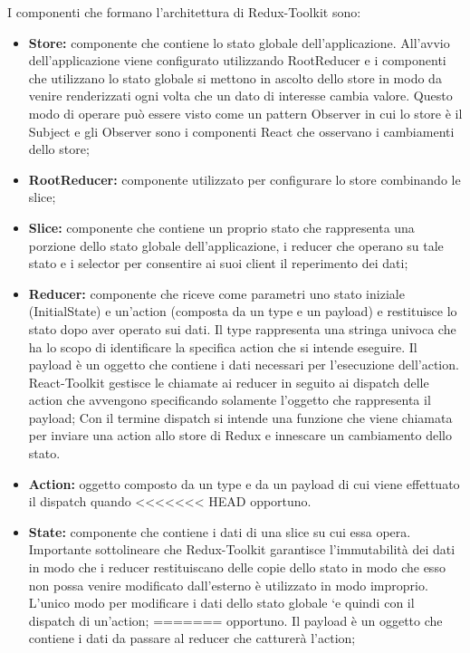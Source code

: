 I componenti che formano l'architettura di Redux-Toolkit sono:
\begin{itemize}
    \item \textbf{Store:} componente che contiene lo stato globale dell'applicazione.
          All'avvio dell'applicazione viene configurato utilizzando RootReducer e i componenti che utilizzano
          lo stato globale si mettono in ascolto dello store in modo da venire renderizzati ogni volta che un dato
          di interesse cambia valore. Questo modo di operare può essere visto come un pattern Observer in
          cui lo store è il Subject e gli Observer sono i componenti React che osservano i cambiamenti dello store;
    \item \textbf{RootReducer:} componente utilizzato per configurare lo store combinando le slice;
    \item \textbf{Slice:} componente che contiene un proprio stato che rappresenta una porzione dello stato globale
          dell'applicazione, i reducer che operano su tale stato e i selector per consentire ai suoi client il
          reperimento dei dati;
    \item \textbf{Reducer:} componente che riceve come parametri uno stato iniziale (InitialState) e un'action
          (composta da un type e un payload) e restituisce lo stato dopo aver operato sui dati.
          Il type rappresenta una stringa univoca che ha lo scopo di identificare la specifica action che si intende eseguire.
          Il payload è un oggetto che contiene i dati necessari per l'esecuzione dell'action.
          React-Toolkit gestisce le chiamate ai reducer in seguito ai dispatch delle action che avvengono
          specificando solamente l'oggetto che rappresenta il payload;
          Con il termine dispatch si intende una funzione che viene chiamata per inviare una action allo store di Redux e innescare un cambiamento dello stato.
    \item \textbf{Action:} oggetto composto da un type e da un payload di cui viene effettuato il dispatch quando
<<<<<<< HEAD
    opportuno.
    \item \textbf{State:} componente che contiene i dati di una slice su cui essa opera.
    Importante sottolineare che Redux-Toolkit garantisce l’immutabilità dei dati in modo che i reducer restituiscano delle copie dello stato in modo che esso non possa venire
    modificato dall’esterno è utilizzato in modo improprio.
    L’unico modo per modificare i dati dello stato globale `e quindi con il dispatch di un’action;
=======
          opportuno. Il payload è un oggetto che contiene i dati da passare al reducer che catturerà l'action;

\end{itemize}
